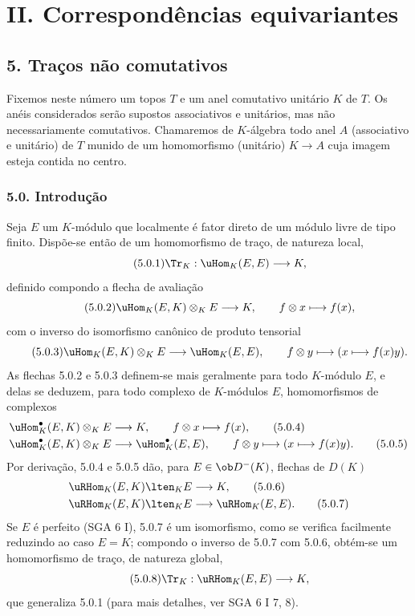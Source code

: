 \section*{II. Correspondências equivariantes}

\subsection*{5. Traços não comutativos}

Fixemos neste número um topos $T$ e um anel comutativo unitário $K$ de $T$. Os anéis considerados serão supostos associativos e unitários, mas não necessariamente comutativos. Chamaremos de $K$-álgebra todo anel $A$ (associativo e unitário) de $T$ munido de um homomorfismo (unitário) $K\to A$ cuja imagem esteja contida no centro.

\subsubsection*{5.0. Introdução}

Seja $E$ um $K$-módulo que localmente é fator direto de um módulo livre de tipo finito. Dispõe-se então de um homomorfismo de traço, de natureza local,
\begin{equation}\tag{5.0.1}
\Tr_K:\uHom_K(E,E)\longrightarrow K,
\end{equation}
definido compondo a flecha de avaliação
\begin{equation}\tag{5.0.2}
\uHom_K(E,K)\otimes_KE\longrightarrow K,\qquad f\otimes x\longmapsto f(x),
\end{equation}
com o inverso do isomorfismo canônico de produto tensorial
\begin{equation}\tag{5.0.3}
\uHom_K(E,K)\otimes_KE\longrightarrow\uHom_K(E,E),\qquad f\otimes y\longmapsto (x\longmapsto f(x)y).
\end{equation}
As flechas 5.0.2 e 5.0.3 definem-se mais geralmente para todo $K$-módulo $E$, e delas se deduzem, para todo complexo de $K$-módulos $E$, homomorfismos de complexos
\begin{align}
\uHom_K^\bullet(E,K)\otimes_KE&\longrightarrow K,\qquad f\otimes x\longmapsto f(x),\tag{5.0.4}\\
\uHom_K^\bullet(E,K)\otimes_KE&\longrightarrow \uHom_K^\bullet(E,E),\qquad f\otimes y\longmapsto (x\longmapsto f(x)y).\tag{5.0.5}
\end{align}
Por derivação, 5.0.4 e 5.0.5 dão, para $E\in\ob D^-(K)$, flechas de $D(K)$
\begin{align}
\uRHom_K(E,K)\lten_KE&\longrightarrow K,\tag{5.0.6}\\
\uRHom_K(E,K)\lten_KE&\longrightarrow\uRHom_K(E,E).\tag{5.0.7}
\end{align}
Se $E$ é perfeito (SGA 6 I), 5.0.7 é um isomorfismo, como se verifica facilmente reduzindo ao caso $E=K$; compondo o inverso de 5.0.7 com 5.0.6, obtém-se um homomorfismo de traço, de natureza global,
\begin{equation}\tag{5.0.8}
\Tr_K:\uRHom_K(E,E)\longrightarrow K,
\end{equation}
que generaliza 5.0.1 (para mais detalhes, ver SGA 6 I 7, 8).
